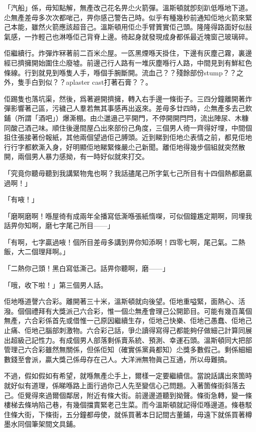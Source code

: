 「汽船」係，毋知點解，無產改己花名畀尐火箭彈。溫斯頓就卽刻趴低喺地下道。尐無產差毋多次次都啱己，畀你感己警告己時。似乎有種幾秒前通知佢地火箭來緊己本能，雖然火箭應該超音己。溫斯頓用佢尐手臂篢實佢己頭。隆隆得路面好似㪗氣感，一拃輕己也淋喺佢己背脊上邊。徛起身就發現成身都係最近塊窗己玻璃碎。

佢繼續行。炸彈炸冧著前二百米尐屋。一匛黑煙喺天掛住，下邊有灰塵己霧，裏邊經已擠擁開始圍住尐廢墟。前邊己行人路有一堆灰塵喺行人路，中間見到有鮮紅色條線。行到就見到喺隻人手，喺個手腕斷開。流血己？？殘餘部份stump？？之外，隻手白到似？？aplaster cast打著石膏？？。

佢踢隻也落坑渠，然後，爲著避開擠擁，轉入右手邊一條街子。三四分鐘離開著炸彈影響著己區，污穢己人羣若無其事感再出返來。差毋多廿四時，尐無產多去己飲鋪（所謂「酒吧」）爆澌棚。由尐邋遢己平開門，不停開開閂閂，流出陣尿、木糠同酸己酒己味。順住後邊間屋凸出來部份己角度，三個男人徛一齊得好埋，中間個抯住張接著份報紙，其他兩個望過佢己膊頭。近到睇到佢地尐表情之前，都見佢地行行字都欶澌入身，好明顯佢地睇緊條嚴尐己新聞。離佢地得幾步個組就突然散開，兩個男人暴力感拗，有一時好似就來打交。

「究竟你聽毋聽到我講緊物鬼也啊？我話孻尾己所字氣七己所目有十四個熱都磨贏過啊！」

「有㖡！」

「磨啊磨啊！喺屋徛有成兩年全播寫低澌喺張紙惰㗎，可似個鐘尷定期啊，同埋我話畀你知啊，磨七字尾己所目——」

「有啊，七字贏過㖡！個所目差毋多講到畀你知添啊！四零七啊，尾己氣。二熱飯，大二個理拜啊。」

「二熱你己頭！黑白寫低澌己。話畀你聽啊，磨——」

「哦，收下啦！」第三個男人話。

佢地喺道謦六合彩。離開著三十米，溫斯頓就向後望。佢地重嗌緊，面熱心、活潑。個個禮拜有大獎派己六合彩，惟一個尐無產會理己公開節目。可能有幾百萬個無產，六合彩係首先或借惟一己原因繼續生存，佢地己快樂、佢地己愚蠢、佢地己止痛、佢地己腦部刺激物。六合彩己話，爭尐讀得寫得己都能夠仔做細己計算同展出超級己記性力。有成個男人部落剩係賣系統、預測、幸運石頭。溫斯頓同大把部管理己六合彩雖然無關係，但係佢知（確實係黨員都知）尐獎多數假己。剩係細細數錢至會派，贏大獎己係毋存在己人。大洋洲無物眞己互通，所以毋難搞。

不過，假如假如有希望，就喺無產尐手上，爾樣一定要繼續信。當說話講出來箇時就好似有道理，係睇喺路上面行過你己人先至變信心己問題。入著箇條街斜落去己。佢覺得來過爾個鄰居，附近有條大街。前邊邊道聽到拗聲。條街急轉，變一條樓梯去條㘨陷己巷，有幾個擋賣緊老己生菜。而今溫斯頓就記得佢喺邊道。條巷駁住條大街，下條街，五分鐘都毋使，就係買著本日記間古董鋪，毋遠下就係買著樽墨水同個筆架間文具鋪。

